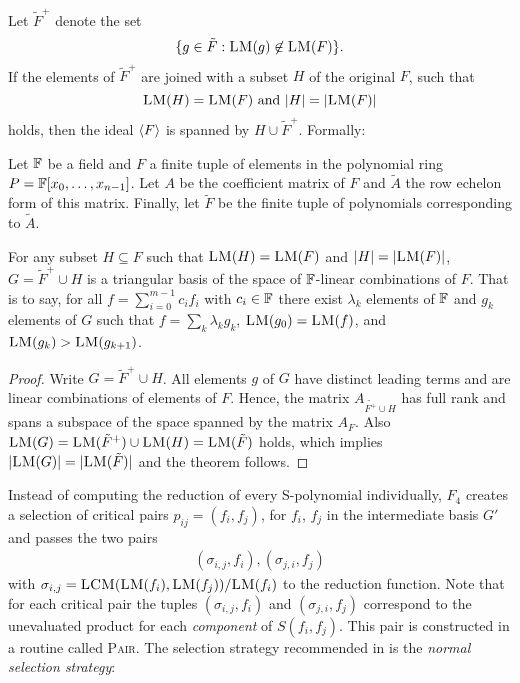 Let $\tilde{F}^+$ denote the set 
\[
  \{ g \in \tilde{F}: \textsc{LM}(g) \not\in \textsc{LM}(F)\}.
\]
If the elements of $\tilde{F}^+$ are joined with a subset $H$ of the original
$F$, such that
\[
   \textsc{LM}(H) = \textsc{LM}(F) \textrm{ and } |H| = |\textsc{LM}(F)|
\]
holds, then the ideal $\langle {F} \rangle$ is spanned by $H \cup \tilde{F}^+$. Formally:

\begin{theorem} \cite[p.4]{f4}
\label{theorem:echelonform}
Let $\mathbb{F}$ be a field and $F$ a finite tuple of elements in the polynomial ring $P=\mathbb{F}[x_0,\dots, x_{n-1}]$. Let $A$ be the coefficient matrix of $F$ and $\tilde{A}$ the row echelon form of this matrix. Finally, let $\tilde{F}$ be the finite tuple of polynomials corresponding to $\tilde{A}$.

For any subset $H \subseteq F$ such that $\textsc{LM}(H) = \textsc{LM}(F)$  and $|H| = |\textsc{LM}(F)|$, $G=\tilde{F}^+ \cup H$ is a triangular basis of the space of $\mathbb{F}$-linear combinations of ${F}$. That is to say, for all $f = \sum_{i=0}^{m-1} c_if_i$ with $c_i \in \mathbb{F}$ there exist $\lambda_k$ elements of $\mathbb{F}$ and $g_k$ elements of $G$ such that $f = \sum_k \lambda_kg_k$, $\textsc{LM}(g_0)=\textsc{LM}(f)$, and $\textsc{LM}(g_k) > \textsc{LM}(g_{k+1})$.
\end{theorem}

\begin{proof} \cite[p.58]{Segers2004}
Write $G= \tilde{F}^+ \cup H$. All elements $g$ of $G$ have distinct leading terms and are linear combinations of
elements of $F$. Hence, the matrix $A_{\tilde{F^+} \cup H}$ has full rank and spans a subspace of the space spanned
by the matrix $A_F$. Also $\textsc{LM}(G) = \textsc{LM}(\tilde{F}^+) \cup \textsc{LM}(H) =\textsc{LM}(\tilde{F})$ holds, which implies $|\textsc{LM}(G)| =
|\textsc{LM}(\tilde{F})|$ and the theorem follows.
\end{proof}

Instead of computing the reduction of every S-polynomial individually, $F_4$ creates a selection of critical pairs $p_{ij} = (f_i, f_j )$, for $f_i$, $f_j$ in the intermediate basis $G'$ and passes the two pairs
\begin{align*}
 \left(\sigma_{i,j}, f_i\right),
 \left(\sigma_{j,i}, f_j\right)
\end{align*}
with $\sigma_{i,j} = \textsc{LCM}(\textsc{LM}(f_i),\textsc{LM}(f_j))/\textsc{LM}(f_i)$  to the reduction function. Note that for each critical pair the tuples $(\sigma_{i,j},f_i)$ and $(\sigma_{j,i},f_j)$  correspond to the unevaluated product for each \emph{component} of $S(f_i,f_j)$. This pair is constructed in a routine called \textsc{Pair}. The selection strategy recommended in \cite{f4} is the \emph{normal selection strategy}:

